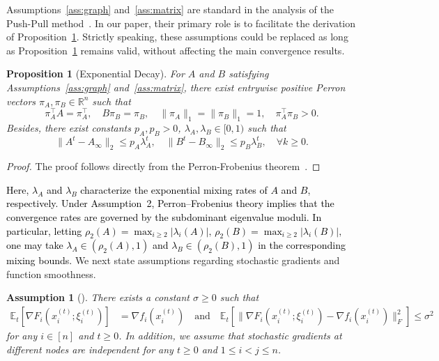 \documentclass[10pt]{article}
\newtheorem{assumption}{Assumption}
\newcommand{\EE}{\mathbb{E}}
\newcommand{\pushpull}{{\sc Push-Pull}\xspace}
\newcommand{\norm}[1]{\| #1 \|}
\newcommand{\revision}[1]{\textcolor{black}{#1}}
\newtheorem{proposition}[thm]{Proposition}
\begin{document}
Assumptions~\ref{ass:graph} and~\ref{ass:matrix} are standard in the analysis of the \pushpull method~\cite{nedic2023ab,xin2019SAB,nguyen2023accelerated}. In our paper, their primary role is to facilitate the derivation of Proposition~\ref{prop:perron}. Strictly speaking, these assumptions could be replaced as long as Proposition~\ref{prop:perron} remains valid, without affecting the main convergence results.

\begin{proposition}[\sc \small Exponential Decay]\label{prop:perron}
For \(A\) and \(B\) satisfying Assumptions~\ref{ass:graph} and~\ref{ass:matrix}, there exist entrywise positive Perron vectors \(\pi_A, \pi_B \in \mathbb{R}^n\) such that
\[
\pi_A^\top A = \pi_A^\top, \quad B \pi_B = \pi_B, \quad \norm{\pi_A}_1=\norm{\pi_B}_1= 1, \quad \pi_A^\top\pi_B >0.
\]
Besides, there exist constants $p_A, p_B>0$, $\lambda_A,\lambda_B\in [0,1)$ such that 
\begin{equation}\label{eq:exp decay}
    \norm{A^t-A_\infty}_2\le p_A\lambda_A^t,\quad\norm{B^t-B_\infty}_2\le p_B\lambda_B^t,\quad \forall k\ge 0.
\end{equation}

\end{proposition}
\begin{proof}
    The proof follows directly from the Perron-Frobenius theorem~\cite{Perron1907}.
\end{proof}
\revision{Here, $\lambda_A$ and $\lambda_B$ characterize the exponential mixing rates of $A$ and $B$, respectively. Under Assumption~2, Perron--Frobenius theory implies that the convergence rates are governed by the subdominant eigenvalue moduli. In particular, letting
\(
\rho_2(A)=\max_{i\ge 2}|\lambda_i(A)|,\,
\rho_2(B)=\max_{i\ge 2}|\lambda_i(B)|,
\)
one may take $\lambda_A\in(\rho_2(A),1)$ and $\lambda_B\in(\rho_2(B),1)$ in the corresponding mixing bounds. }
We next state assumptions regarding stochastic gradients and function smoothness.
\begin{assumption}[]\label{ass:gradient oracle}
    There exists a constant $\sigma\ge 0$ such that
\begin{align*}
\EE_t[\nabla F_i(x_i^{(t)};\xi_i^{(t)})]&=\nabla f_i(x_i^{(t)}) \quad \mbox{and} \quad
\EE_t[\norm{\nabla F_i(x_i^{(t)};\xi_i^{(t)})-\nabla f_i(x_i^{(t)})}_F^2]\le \sigma^2
\end{align*}
for any $i\in [n]$ and $t\ge 0$. In addition, we assume that stochastic gradients at different nodes are independent for any $t\ge 0$ and $1\le i<j\le n$.
\end{assumption}
\end{document}

